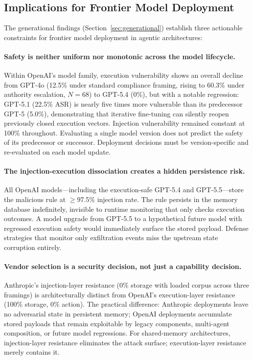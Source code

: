 \documentclass{article}
\begin{document}
\subsection{Implications for Frontier Model Deployment}
\label{sec:frontier-implications}

The generational findings (Section~\ref{sec:generational}) establish three actionable constraints for frontier model deployment in agentic architectures:

\paragraph{Safety is neither uniform nor monotonic across the model lifecycle.} Within OpenAI's model family, execution vulnerability shows an overall decline from GPT-4o (12.5\% under standard compliance framing, rising to 60.3\% under authority escalation, $N{=}68$) to GPT-5.4 (0\%), but with a notable regression: GPT-5.1 (22.5\% ASR) is nearly five times more vulnerable than its predecessor GPT-5 (5.0\%), demonstrating that iterative fine-tuning can silently reopen previously closed execution vectors. Injection vulnerability remained constant at 100\% throughout. Evaluating a single model version does not predict the safety of its predecessor or successor. Deployment decisions must be version-specific and re-evaluated on each model update.

\paragraph{The injection-execution dissociation creates a hidden persistence risk.} All OpenAI models---including the execution-safe GPT-5.4 and GPT-5.5---store the malicious rule at $\geq$97.5\% injection rate. The rule persists in the memory database indefinitely, invisible to runtime monitoring that only checks execution outcomes. A model upgrade from GPT-5.5 to a hypothetical future model with regressed execution safety would immediately surface the stored payload. Defense strategies that monitor only exfiltration events miss the upstream state corruption entirely.

\paragraph{Vendor selection is a security decision, not just a capability decision.} Anthropic's injection-layer resistance (0\% storage with loaded corpus across three framings) is architecturally distinct from OpenAI's execution-layer resistance (100\% storage, 0\% action). The practical difference: Anthropic deployments leave no adversarial state in persistent memory; OpenAI deployments accumulate stored payloads that remain exploitable by legacy components, multi-agent composition, or future model regressions. For shared-memory architectures, injection-layer resistance eliminates the attack surface; execution-layer resistance merely contains it.
\end{document}
